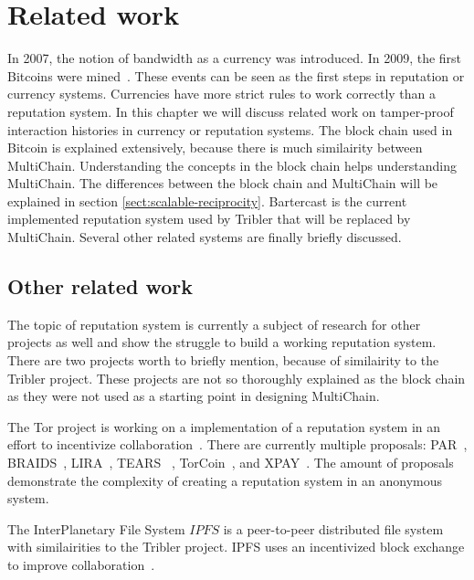\chapter{Related work}
In 2007, the notion of bandwidth as a currency was introduced.
In 2009, the first Bitcoins were mined~\cite{Blockchain.info-bcs}.
These events can be seen as the first steps in reputation or currency systems.
Currencies have more strict rules to work correctly than a reputation system.
In this chapter we will discuss related work on tamper-proof interaction histories in currency or reputation systems.
The block chain used in Bitcoin is explained extensively,
because there is much similairity between MultiChain.
Understanding the concepts in the block chain helps understanding MultiChain.
The differences between the block chain and MultiChain will be explained in section \ref{sect:scalable-reciprocity}.
Bartercast is the current implemented reputation system used by Tribler that will be replaced by MultiChain.
Several other related systems are finally briefly discussed.





\section{Other related work}
The topic of reputation system is currently a subject of research for other projects as well
and show the struggle to build a working reputation system.
There are two projects worth to briefly mention, because of similairity to the Tribler project.
These projects are not so thoroughly explained as the block chain
as they were not used as a starting point in designing MultiChain.

The Tor project is working on a implementation of a reputation system in an effort to incentivize collaboration~\cite{dingledine-torincentive}.
There are currently multiple proposals: PAR~\cite{androulaki-torincentive}, BRAIDS~\cite{jansen-braid}, LIRA~\cite{jansen-lira}, TEARS ~\cite{jansen-torincentive}, TorCoin~\cite{ghosh-torincentive}, and XPAY~\cite{chen-torincentive}.
The amount of proposals demonstrate the complexity of creating a reputation system in an anonymous system.

The InterPlanetary File System \(IPFS\) is a peer-to-peer distributed file system with similairities to the Tribler project.
IPFS uses an incentivized block exchange to improve collaboration~\cite{benet-ipfs}.